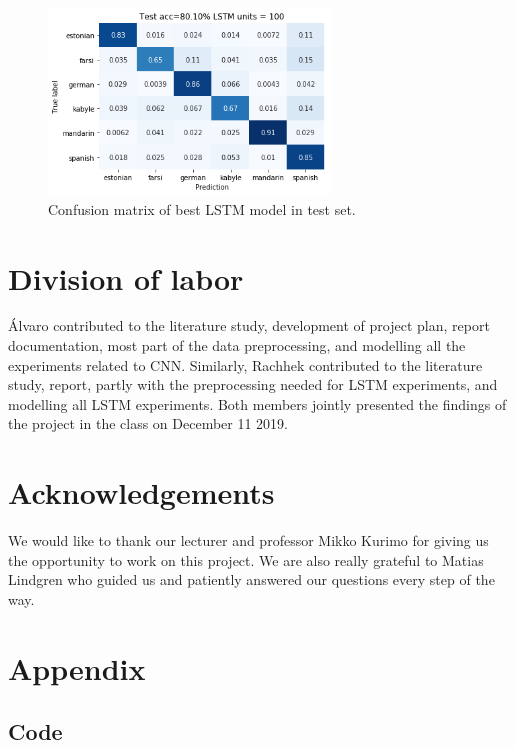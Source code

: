 \documentclass[12pt]{extarticle}
\begin{document}
\begin{figure}[h]
\centering
\includegraphics[width=7.5cm]{Figures/12.png}
\caption{Confusion matrix of best LSTM model in test set.}
\label{fig11}
\end{figure}

\section{Division of labor}

Álvaro contributed to the literature study, development of project plan, report documentation, most part of the data preprocessing, and modelling all the experiments related to CNN. Similarly, Rachhek contributed to the literature study, report, partly with the preprocessing needed for LSTM experiments, and modelling all LSTM experiments. Both members jointly presented the findings of the project in the class on December 11 2019.

\section{Acknowledgements}

We would like to thank our lecturer and professor Mikko Kurimo for giving us the opportunity to work on this project. We are also really grateful to Matias Lindgren who guided us and patiently answered our questions every step of the way.

\newpage




\newpage

\section*{Appendix}

\subsection*{Code}
\end{document}
